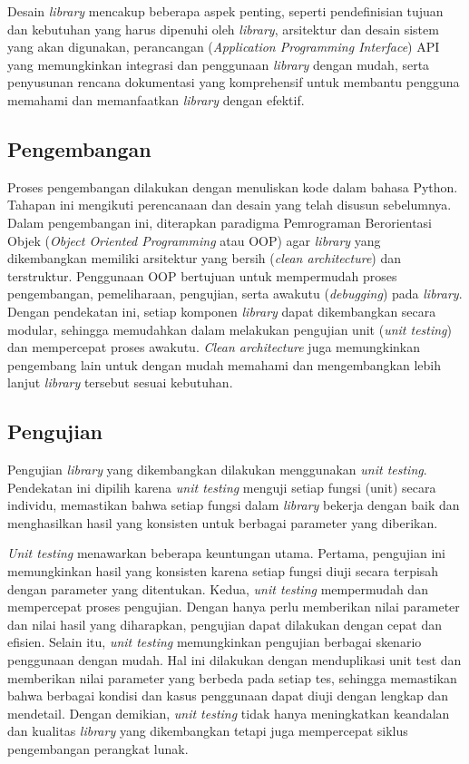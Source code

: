 Desain \textit{library} mencakup beberapa aspek penting, seperti pendefinisian tujuan dan kebutuhan yang harus dipenuhi oleh \textit{library}, arsitektur dan desain sistem yang akan digunakan, perancangan (\textit{Application Programming Interface}) API yang memungkinkan integrasi dan penggunaan \textit{library} dengan mudah, serta penyusunan rencana dokumentasi yang komprehensif untuk membantu pengguna memahami dan memanfaatkan \textit{library} dengan efektif.

\subsection{Pengembangan}
Proses pengembangan dilakukan dengan menuliskan kode dalam bahasa Python. Tahapan ini mengikuti perencanaan dan desain yang telah disusun sebelumnya. Dalam pengembangan ini, diterapkan paradigma Pemrograman Berorientasi Objek (\textit{Object Oriented Programming} atau OOP) agar \textit{library} yang dikembangkan memiliki arsitektur yang bersih (\textit{clean architecture}) dan terstruktur. Penggunaan OOP bertujuan untuk mempermudah proses pengembangan, pemeliharaan, pengujian, serta awakutu (\textit{debugging}) pada \textit{library}. Dengan pendekatan ini, setiap komponen \textit{library} dapat dikembangkan secara modular, sehingga memudahkan dalam melakukan pengujian unit (\textit{unit testing}) dan mempercepat proses awakutu. \textit{Clean architecture} juga memungkinkan pengembang lain untuk dengan mudah memahami dan mengembangkan lebih lanjut \textit{library} tersebut sesuai kebutuhan.

\subsection{Pengujian}
Pengujian \textit{library} yang dikembangkan dilakukan menggunakan \textit{unit testing}. Pendekatan ini dipilih karena \textit{unit testing} menguji setiap fungsi (unit) secara individu, memastikan bahwa setiap fungsi dalam \textit{library} bekerja dengan baik dan menghasilkan hasil yang konsisten untuk berbagai parameter yang diberikan.

\textit{Unit testing} menawarkan beberapa keuntungan utama. Pertama, pengujian ini memungkinkan hasil yang konsisten karena setiap fungsi diuji secara terpisah dengan parameter yang ditentukan. Kedua, \textit{unit testing} mempermudah dan mempercepat proses pengujian. Dengan hanya perlu memberikan nilai parameter dan nilai hasil yang diharapkan, pengujian dapat dilakukan dengan cepat dan efisien. Selain itu, \textit{unit testing} memungkinkan pengujian berbagai skenario penggunaan dengan mudah. Hal ini dilakukan dengan menduplikasi unit test dan memberikan nilai parameter yang berbeda pada setiap tes, sehingga memastikan bahwa berbagai kondisi dan kasus penggunaan dapat diuji dengan lengkap dan mendetail. Dengan demikian, \textit{unit testing} tidak hanya meningkatkan keandalan dan kualitas \textit{library} yang dikembangkan tetapi juga mempercepat siklus pengembangan perangkat lunak.